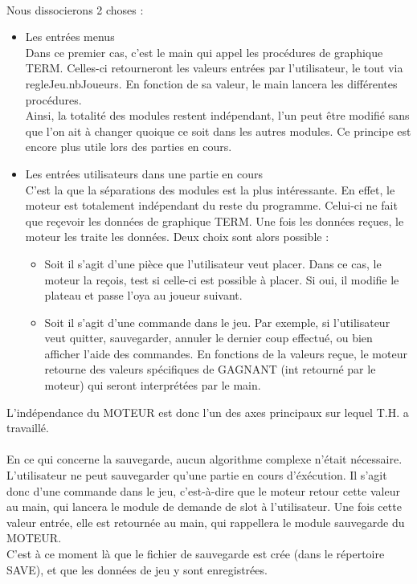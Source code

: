 \documentclass{report}
\begin{document}
        \paragraph*{} %
	Nous dissocierons 2 choses : 
	\begin{itemize} %
		\item Les entrées menus\\
		Dans ce premier cas, c'est le main qui appel les procédures de graphique TERM. Celles-ci retourneront les valeurs entrées par l'utilisateur, le tout via regleJeu.nbJoueurs. En fonction de sa valeur, le main lancera les différentes procédures.\\
		Ainsi, la totalité des modules restent indépendant, l'un peut être modifié sans que l'on ait à changer quoique ce soit dans les autres modules. Ce principe est encore plus utile lors des parties en cours. 
		\item Les entrées utilisateurs dans une partie en cours\\
		C'est la que la séparations des modules est la plus intéressante. En effet, le moteur est totalement indépendant du reste du programme. Celui-ci ne fait que reçevoir les données de graphique TERM. 
		Une fois les données reçues, le moteur les traite les données. Deux choix sont alors possible :
		\begin{itemize} %
			\item Soit il s'agit d'une pièce que l'utilisateur veut placer. Dans ce cas, le moteur la reçois, test si celle-ci est possible à placer. Si oui, il modifie le plateau et passe l'oya au joueur suivant. 
			\item Soit il s'agit d'une commande dans le jeu. Par exemple, si l'utilisateur veut quitter, sauvegarder, annuler le dernier coup effectué, ou bien afficher l'aide des commandes. En fonctions de la valeurs reçue, le moteur retourne des valeurs spécifiques de GAGNANT (int retourné par le moteur) qui seront interprétées par le main.\\
                \end{itemize}
        \end{itemize}
	
	L'indépendance du MOTEUR est donc l'un des axes principaux sur lequel T.H. a travaillé.\\
		
        \paragraph*{} %
	En ce qui concerne la sauvegarde, aucun algorithme complexe n'était nécessaire. L'utilisateur ne peut sauvegarder qu'une partie en cours d'éxécution. Il s'agit donc d'une commande dans le jeu, c'est-à-dire que le moteur retour cette valeur au main, qui lancera le module de demande de slot à l'utilisateur. 
	Une fois cette valeur entrée, elle est retournée au main, qui rappellera le module sauvegarde du MOTEUR.\\
	C'est à ce moment là que le fichier de sauvegarde est crée (dans le répertoire SAVE), et que les données de jeu y sont enregistrées.\\
	
\end{document}
